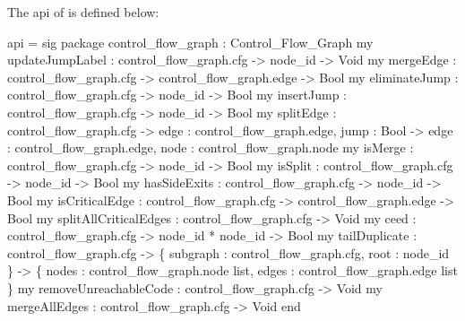 The api of  is defined below:
\begin{SML}
 api  = sig
    package control_flow_graph : Control_Flow_Graph
    my updateJumpLabel : control_flow_graph.cfg -> node_id -> Void
    my mergeEdge       : control_flow_graph.cfg -> control_flow_graph.edge -> Bool
    my eliminateJump   : control_flow_graph.cfg -> node_id -> Bool
    my insertJump      : control_flow_graph.cfg -> node_id -> Bool
    my splitEdge  : control_flow_graph.cfg -> { edge : control_flow_graph.edge, jump : Bool }
                      -> { edge : control_flow_graph.edge, node : control_flow_graph.node }
    my isMerge        : control_flow_graph.cfg -> node_id -> Bool
    my isSplit        : control_flow_graph.cfg -> node_id -> Bool
    my hasSideExits   : control_flow_graph.cfg -> node_id -> Bool
    my isCriticalEdge : control_flow_graph.cfg -> control_flow_graph.edge -> Bool
    my splitAllCriticalEdges : control_flow_graph.cfg -> Void
    my ceed : control_flow_graph.cfg -> node_id * node_id -> Bool
    my tailDuplicate : control_flow_graph.cfg -> \{ subgraph : control_flow_graph.cfg, root : node_id \} 
                                -> \{ nodes : control_flow_graph.node list, 
                                     edges : control_flow_graph.edge list \} 
    my removeUnreachableCode : control_flow_graph.cfg -> Void
    my mergeAllEdges : control_flow_graph.cfg -> Void
 end
\end{SML}

